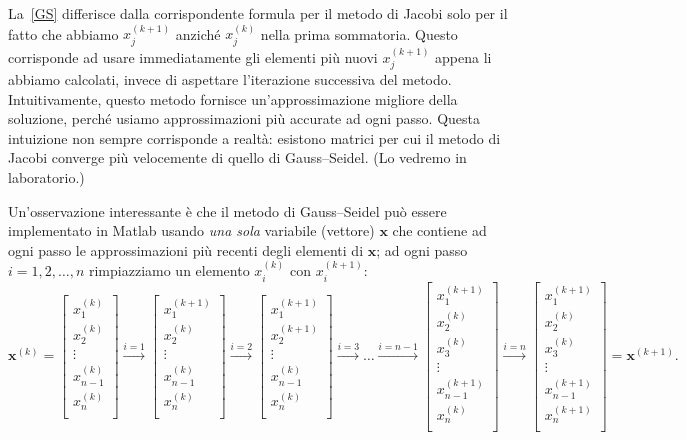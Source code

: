\documentclass[a4paper]{report}
\theoremstyle{definition}
\theoremstyle{remark}
\newcommand{\x}{\mathbf{x}}
\begin{document}
La~\eqref{GS} differisce dalla corrispondente formula per il metodo di Jacobi solo per il fatto che abbiamo $x_j^{(k+1)}$ anziché $x_j^{(k)}$ nella prima sommatoria. Questo corrisponde ad usare immediatamente gli elementi più nuovi $x_j^{(k+1)}$ appena li abbiamo calcolati, invece di aspettare l'iterazione successiva del metodo. Intuitivamente, questo metodo fornisce un'approssimazione migliore della soluzione, perché usiamo approssimazioni più accurate ad ogni passo. Questa intuizione non sempre corrisponde a realtà: esistono matrici per cui il metodo di Jacobi converge più velocemente di quello di Gauss--Seidel. (Lo vedremo in laboratorio.)

Un'osservazione interessante è che il metodo di Gauss--Seidel può essere implementato in Matlab usando \emph{una sola} variabile (vettore) $\x$ che contiene ad ogni passo le approssimazioni più recenti degli elementi di $\x$; ad ogni passo $i=1,2,\dots,n$ rimpiazziamo un elemento $x_i^{(k)}$ con $x_i^{(k+1)}$:
\[
\x^{(k)} = \begin{bmatrix}
    x^{(k)}_1\\ 
    x^{(k)}_2\\ 
    \vdots \\
    x^{(k)}_{n-1}\\ 
    x^{(k)}_n\\ 
\end{bmatrix} \stackrel{i=1}{\to}
\begin{bmatrix}
    x^{(k+1)}_1\\ 
    x^{(k)}_2\\ 
    \vdots \\
    x^{(k)}_{n-1}\\ 
    x^{(k)}_n\\ 
\end{bmatrix} \stackrel{i=2}{\to}
\begin{bmatrix}
    x^{(k+1)}_1\\ 
    x^{(k+1)}_2\\ 
    \vdots \\
    x^{(k)}_{n-1}\\ 
    x^{(k)}_n\\ 
\end{bmatrix} \stackrel{i=3}{\to}
\dots
\stackrel{i=n-1}{\to}
\begin{bmatrix}
    x^{(k+1)}_1\\ 
    x^{(k)}_2\\ 
    x^{(k)}_3\\ 
    \vdots \\
    x^{(k+1)}_{n-1}\\ 
    x^{(k)}_n\\ 
\end{bmatrix} \stackrel{i=n}{\to}
\begin{bmatrix}
    x^{(k+1)}_1\\ 
    x^{(k)}_2\\ 
    x^{(k)}_3\\ 
    \vdots \\
    x^{(k+1)}_{n-1}\\ 
    x^{(k+1)}_n\\ 
\end{bmatrix} = \x^{(k+1)}.
\]
\end{document}
